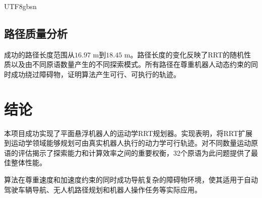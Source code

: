 \documentclass[11pt]{article}
\begin{document}
\begin{CJK}{UTF8}{gbsn}
\subsection{路径质量分析}

成功的路径长度范围从$16.97$ m到$18.45$ m。路径长度的变化反映了RRT的随机性质以及由不同原语数量产生的不同探索模式。所有路径在尊重机器人动态约束的同时成功绕过障碍物，证明算法产生可行、可执行的轨迹。

\section{结论}

本项目成功实现了平面悬浮机器人的运动学RRT规划器。实现表明，将RRT扩展到运动学领域能够规划可由真实机器人执行的动力学可行轨迹。对不同数量运动原语的评估揭示了探索能力和计算效率之间的重要权衡，32个原语为此问题提供了最佳整体性能。

算法在尊重速度和加速度约束的同时成功导航复杂的障碍物环境，使其适用于自动驾驶车辆导航、无人机路径规划和机器人操作任务等实际应用。

\end{CJK}
\end{document}
